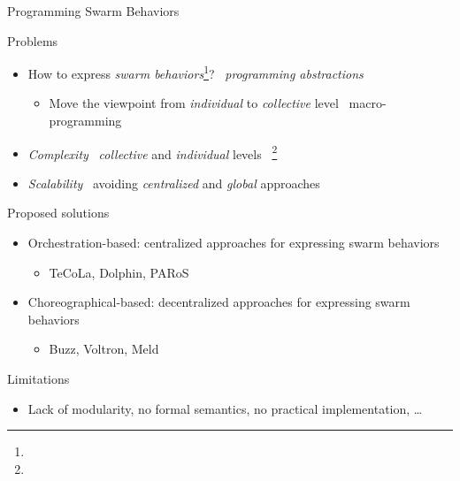 \documentclass[presentation, 9pt]{beamer}\mode<presentation>{\usetheme{AMSBolognaFC}}
\begin{document}
\begin{frame}{Programming Swarm Behaviors}
	\begin{block}{Problems}
		\begin{itemize}
			\item How to express \emph{swarm behaviors}\footnote{}? \faArrowRight \, \emph{programming abstractions} 
			\begin{itemize}
				\item Move the viewpoint from \emph{individual} to \emph{collective} level \faArrowRight \, macro-programming 
			\end{itemize}
			\item \emph{Complexity} \faArrowRight \, \emph{collective} and \emph{individual} levels \faArrowRight \, \footnote{}
			\item \emph{Scalability} \faArrowRight \, avoiding \emph{centralized} and \emph{global} approaches
		\end{itemize}
	\end{block}
	\begin{alertblock}{Proposed solutions}
		\begin{itemize}
			\item Orchestration-based: centralized approaches for expressing swarm behaviors
			\begin{itemize}
				\item TeCoLa, Dolphin, PARoS
			\end{itemize}
			\item Choreographical-based: decentralized approaches for expressing swarm behaviors
			\begin{itemize}
				\item Buzz, Voltron, Meld
			\end{itemize}
		\end{itemize}
	\end{alertblock}
	\begin{block}{Limitations}
		\begin{itemize}
			\item Lack of modularity, no formal semantics, no practical implementation, \dots
		\end{itemize}
	\end{block}
\end{frame}
\end{document}
